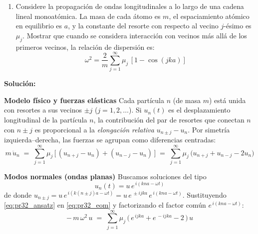 \documentclass{article}
\newenvironment{AGbox}[1][7]%
{%
  \begin{tcolorbox}[
    enhanced, breakable,
    colframe=AppleGreen,
    colback=AppleGreen!#1,
    boxrule=1pt,
    borderline west={2mm}{-10mm}{AppleGreen},
    sharp corners=southwest,
    left=14pt,right=14pt,top=10pt,bottom=10pt,
     boxsep=6pt,
  ]%
}{%
  \end{tcolorbox}%
}
\begin{document}
\vspace{0.5cm}

\begin{AGbox}[8]
\begin{enumerate}[label={{\textcolor{trueblue}{\textbf{Pr.} \arabic*.2}}}, start=1]
  \item Considere la propagación de ondas longitudinales a lo largo de una cadena lineal monoatómica. La masa de cada átomo es $m$, el espaciamiento atómico en equilibrio es $a$, y la constante del resorte con respecto al vecino $j$-ésimo es $\mu_j$. Mostrar que cuando se considera interacción con vecinos más allá de los primeros vecinos, la relación de dispersión es:
  \begin{equation}
    \omega^2 = \frac{2}{m} \sum_{j=1}^{\infty} \mu_j \, [1 - \cos(jka)]
    \label{eq:dispersion_vecinos}
  \end{equation}
\end{enumerate}
\end{AGbox}

\textcolor{Cinnabar}{\textbf{Solución:}}

\noindent\textbf{Modelo físico y fuerzas elásticas}\;
Cada partícula $n$ (de masa $m$) está unida con resortes a sus vecinos $\pm j$ ($j=1,2,\dots$). Si $u_n(t)$ es el desplazamiento longitudinal de la partícula $n$, la contribución del par de resortes que conectan $n$ con $n\pm j$ es proporcional a la \emph{elongación relativa} $u_{n\pm j}-u_n$. Por simetría izquierda–derecha, las fuerzas se agrupan como diferencias centradas:
\begin{equation}
  m\,\ddot u_n
  \;=\;
  \sum_{j=1}^{\infty} \mu_j \,\big[\, (u_{n+j}-u_n) + (u_{n-j}-u_n) \,\big]
  \;=\;
  \sum_{j=1}^{\infty} \mu_j \,\big(u_{n+j}+u_{n-j}-2u_n\big)
  \label{eq:pr32_eom}
\end{equation}

\noindent\textbf{Modos normales (ondas planas)}\;
Buscamos soluciones del tipo
\begin{equation}
  u_n(t) = u\,e^{\,i(kna-\omega t)}
  \label{eq:pr32_ansatz}
\end{equation}
de donde
\(
u_{n\pm j} = u\,e^{\,i(k(n\pm j)a-\omega t)} = u\,e^{\,\pm i jka}\,e^{\,i(kna-\omega t)}
\).
Sustituyendo \eqref{eq:pr32_ansatz} en \eqref{eq:pr32_eom} y factorizando el factor común $e^{\,i(kna-\omega t)}$:
\begin{equation}
  -\,m\,\omega^2\,u
  \;=\;
  \sum_{j=1}^{\infty} \mu_j \,\big(\,e^{\,i jka}+e^{\,-i jka}-2\,\big)\,u
  \label{eq:pr32_pretrigo}
\end{equation}
\end{document}
